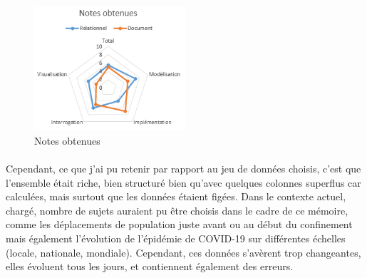 \begin{figure}[!htp]
  \centering
  \includegraphics[width=0.5\textwidth]{./src_img/notes.png}
  \caption{Notes obtenues}
  \label{fig:note}
\end{figure}

\paragraph{}Cependant, ce que j'ai pu retenir par rapport au jeu de données choisis, c'est que l'ensemble était riche, bien structuré bien qu'avec quelques colonnes superflus car calculées, mais surtout que les données étaient figées. Dans le contexte actuel, chargé, nombre de sujets auraient pu être choisis dans le cadre de ce mémoire, comme les déplacements de population juste avant ou au début du confinement mais également l'évolution de l'épidémie de COVID-19 sur différentes échelles (locale, nationale, mondiale). Cependant, ces données s'avèrent trop changeantes, elles évoluent tous les jours, et contiennent également des erreurs.








